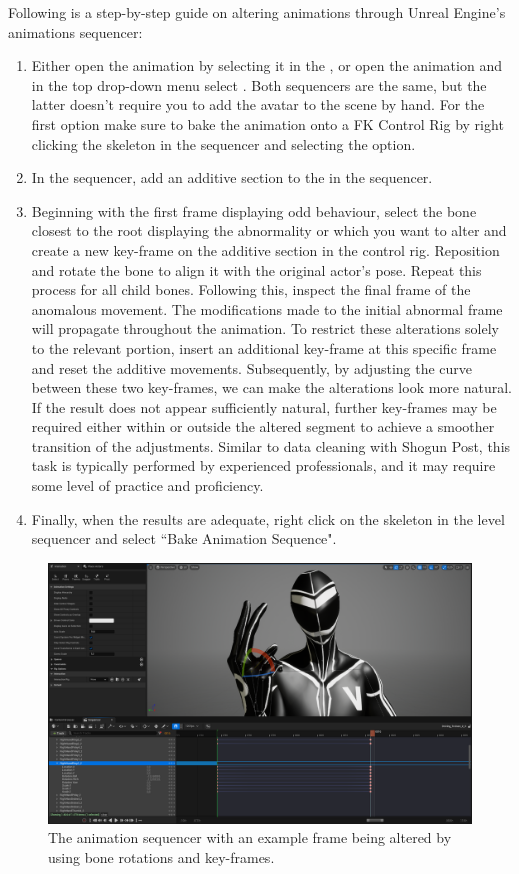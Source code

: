 \documentclass{uva-inf-article}
\begin{document}
Following is a step-by-step guide on altering animations through Unreal Engine's animations sequencer:
\begin{enumerate}
    \item Either open the animation by selecting it in the , or open the animation and in the top  drop-down menu select . Both sequencers are the same, but the latter doesn't require you to add the avatar to the scene by hand. For the first option make sure to bake the animation onto a FK Control Rig by right clicking the skeleton in the sequencer and selecting the  option.
    \item In the sequencer, add an additive section to the  in the sequencer.
    \item Beginning with the first frame displaying odd behaviour, select the bone closest to the root displaying the abnormality or which you want to alter and create a new key-frame on the additive section in the control rig. Reposition and rotate the bone to align it with the original actor's pose. Repeat this process for all child bones. Following this, inspect the final frame of the anomalous movement. The modifications made to the initial abnormal frame will propagate throughout the animation. To restrict these alterations solely to the relevant portion, insert an additional key-frame at this specific frame and reset the additive movements. Subsequently, by adjusting the curve between these two key-frames, we can make the alterations look more natural. If the result does not appear sufficiently natural, further key-frames may be required either within or outside the altered segment to achieve a smoother transition of the adjustments. Similar to data cleaning with Shogun Post, this task is typically performed by experienced professionals, and it may require some level of practice and proficiency.
    \item Finally, when the results are adequate, right click on the skeleton in the level sequencer and select ``Bake Animation Sequence".
\end{enumerate}

\begin{figure}[hbt!]
    \centering
    \includegraphics[width=.8\textwidth]{imgs/CleaningUpAnAnimation.png}
    \caption{The animation sequencer with an example frame being altered by using bone rotations and key-frames.}
    \label{fig:animationsequencer}
\end{figure}
\end{document}
